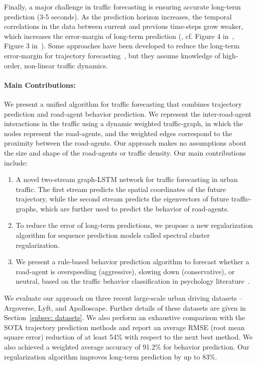 \documentclass[10pt,twocolumn,letterpaper]{article}
\theoremstyle{plain}
\begin{document}
Finally, a major challenge in traffic forecasting is ensuring accurate long-term prediction (3-5 seconds). As the prediction horizon increases, the temporal correlations in the data between current and previous time-steps grow weaker, which increases the error-margin of long-term prediction (\cite{anima}, cf. Figure 4 in~\cite{nachiket,traphic}, Figure 3 in~\cite{li2019grip}). 
Some approaches have been developed to reduce the long-term error-margin for trajectory forecasting~\cite{anima}, but they assume knowledge of high-order, non-linear traffic dynamics.















\paragraph{Main Contributions:} We present a unified algorithm for traffic forecasting that combines trajectory prediction and road-agent behavior prediction. We represent the inter-road-agent interactions in the traffic using a dynamic weighted traffic-graph, in which the nodes represent the road-agents, and the weighted edges correspond to the proximity between the road-agents. Our approach makes no assumptions about the size and shape of the road-agents or traffic density. Our main contributions include: 


\begin{enumerate}[noitemsep]
    \item A novel two-stream graph-LSTM network for traffic forecasting in urban traffic.
The first stream predicts the spatial coordinates of the future trajectory, while the second stream predicts the eigenvectors of future traffic-graphs, which are further used to predict the behavior of road-agents.   


    \item To reduce the error of long-term predictions, we propose a new regularization algorithm for sequence prediction models called spectral cluster regularization. 

    \item We present a rule-based behavior prediction algorithm to forecast whether a road-agent is overspeeding (aggressive), slowing down (conservative), or neutral, based on the traffic behavior classification in psychology literature~\cite{ernestref2, rohanref5}. \end{enumerate}
We evaluate our approach on three recent large-scale urban driving datasets -- Argoverse, Lyft, and Apolloscape. Further details of these datasets are given in Section~\ref{subsec: datasets}. We also perform an exhaustive comparison with the SOTA trajectory prediction methods and report an average RMSE (root mean square error) reduction of at least 54\% with respect to the next best method. We also achieved a weighted average accuracy of 91.2\% for behavior prediction. Our regularization algorithm improves long-term prediction by up to 83\%. 
\end{document}
